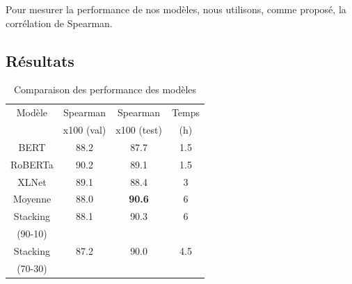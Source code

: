\documentclass[11pt,a4paper, french]{article}
\begin{document}
Pour mesurer la performance de nos modèles, nous utilisons, comme proposé, la corrélation de Spearman.




\subsection{Résultats}



\begin{table}[h!]
\centering
\begin{tabular}{|c| c c c|}
 \hline
 Modèle & Spearman & Spearman & Temps \\[0.5ex]
 & x100 (val) & x100 (test) & (h) \\
 \hline\hline
 BERT     & 88.2 & 87.7 & 1.5 \\
 \hline
 RoBERTa  & 90.2 & 89.1 & 1.5 \\
 \hline
 XLNet    & 89.1 & 88.4 & 3 \\
 \hline
 Moyenne  & 88.0 & \textbf{90.6} & 6 \\
 \hline
 Stacking & 88.1 & 90.3 & 6 \\
 (90-10)  & & & \\
 \hline
 Stacking & 87.2 & 90.0 & 4.5 \\
 (70-30)  &  & & \\
 \hline
 \hline
\end{tabular}
\caption{Comparaison des performance des modèles}
\label{table:models:results}
\end{table}
%
\end{document}
